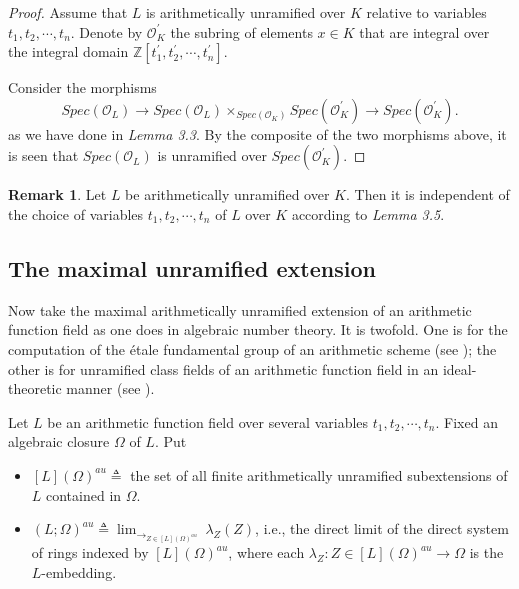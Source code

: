 \documentclass{amsart}
\theoremstyle{definition}
\newtheorem{remark}[theorem]{Remark}
\numberwithin{equation}{section}
\begin{document}
\begin{proof}
Assume that $L$ is arithmetically unramified over $K$ relative to variables $t_{1},t_{2},\cdots, t_{n}$. Denote by $\mathcal{O}_{K}^{\prime}$ the subring
of elements $x\in K$ that are integral over the integral domain $\mathbb{Z}[t_{1}^{\prime},t_{2}^{\prime},\cdots, t_{n}^{\prime}]$.

Consider the morphisms
\begin{equation*}
Spec(\mathcal{O}_{L})\to Spec(\mathcal{O}_{L})\times _{Spec(\mathcal{O}
_{K})} Spec(\mathcal{O}_{K}^{\prime})\to Spec( \mathcal{O}_{K}^{\prime}).
\end{equation*}
as we have done in \emph{Lemma 3.3}. By the composite of the two morphisms
above, it is seen that $Spec(\mathcal{O}_{L})$ is unramified over $Spec(
\mathcal{O}_{K}^{\prime})$.
\end{proof}

\begin{remark}
Let $L$ be arithmetically unramified over $K$. Then it is independent of the
choice of variables $t_{1},t_{2},\cdots, t_{n}$
of $L$ over $K$ according to \emph{Lemma 3.5}.
\end{remark}

\subsection{The maximal unramified extension}

Now take the maximal arithmetically unramified extension of an arithmetic
function field as one does in algebraic number theory. It is twofold. One is for the computation
of the \'{e}tale fundamental group of an arithmetic scheme (see \cite{an4}); the other is for unramified
class fields of an arithmetic function field in an ideal-theoretic manner (see \cite{an5}).

Let $L$ be an arithmetic function field over several variables $t_{1},t_{2},\cdots,
t_{n}$. Fixed an  algebraic closure $\Omega$ of $L$.
Put
\begin{itemize}
\item $\left[ L \right](\Omega)^{au}\triangleq$ the set of all finite
arithmetically unramified subextensions of $L$ contained in $\Omega$.

\item $(L;\Omega)^{au}\triangleq {{\lim}_{\rightarrow_{Z\in {\left[ L \right](\Omega)^{au}}}}}{\ \lambda_{Z}(Z)}$, i.e., the direct limit of the direct
system of rings indexed by $\left[ L \right](\Omega)^{au}$, where each $\lambda_{Z}:Z\in {\left[ L \right](\Omega)^{au}}\to \Omega$ is the $L$-embedding.
\end{itemize}
\end{document}
